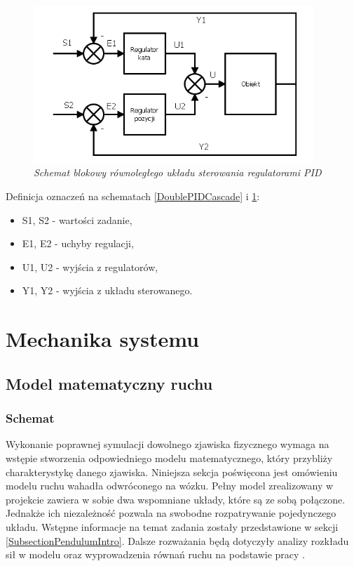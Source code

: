 \documentclass[12pt, oneside]{report}
\theoremstyle{definition}
\begin{document}
\begin{itemize}
\begin{figure}[H]
	\centering
		\includegraphics[width = 300pt]{DoublePIDParallel} 
		\caption{\textit{Schemat blokowy równoległego układu sterowania regulatorami PID\cite{JTJT}}}
		\label{DoublePIDParallel}
\end{figure}
\end{itemize}

Definicja oznaczeń na schematach \ref{DoublePIDCascade} i \ref{DoublePIDParallel}:
\begin{itemize}
\item S1, S2 - wartości zadanie,
\item E1, E2 - uchyby regulacji,
\item U1, U2 - wyjścia z regulatorów,
\item Y1, Y2 - wyjścia z układu sterowanego.
\end{itemize}  

\section{Mechanika systemu}
\subsection{Model matematyczny ruchu}
\label{MathModel}
\subsubsection{Schemat}
Wykonanie poprawnej symulacji dowolnego zjawiska fizycznego wymaga na wstępie stworzenia odpowiedniego modelu matematycznego, który przybliży charakterystykę danego zjawiska. Niniejsza sekcja poświęcona jest omówieniu modelu ruchu wahadła odwróconego na wózku. Pełny model zrealizowany w projekcie zawiera w sobie dwa wspomniane układy, które są ze sobą połączone. Jednakże ich niezależność pozwala na swobodne rozpatrywanie pojedynczego układu. Wstępne informacje na temat zadania zostały przedstawione w sekcji \ref{SubsectionPendulumIntro}. Dalsze rozważania będą dotyczyły analizy rozkładu sił w modelu oraz wyprowadzenia równań ruchu na podstawie pracy \cite{LMIP}.
\end{document}
